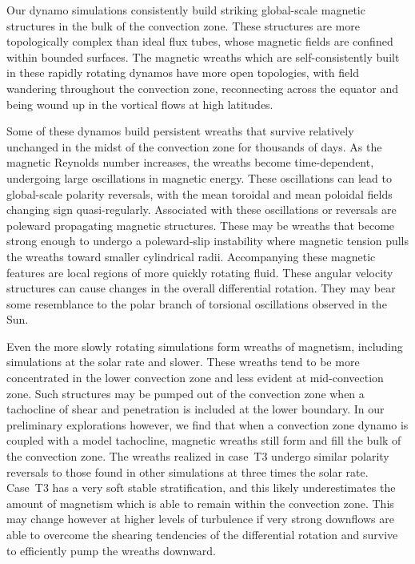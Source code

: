 Our dynamo simulations consistently build striking global-scale
magnetic structures in the bulk of the convection zone.  These
structures are more topologically complex than ideal flux
tubes, whose magnetic fields are confined within bounded surfaces.  The
magnetic wreaths which are self-consistently built in these
rapidly rotating dynamos have more open topologies, with field
wandering throughout the convection zone, reconnecting across the
equator and being wound up in the vortical flows at high latitudes.

Some of these dynamos build persistent wreaths that survive relatively
unchanged in the midst of the convection zone for thousands of days.
As the magnetic Reynolds number increases, the wreaths become
time-dependent, undergoing large oscillations in magnetic energy.
These oscillations can lead to global-scale polarity reversals, with
the mean toroidal and mean poloidal fields changing sign
quasi-regularly.  Associated with these oscillations or reversals are
poleward propagating magnetic structures.  These may be wreaths that
become strong enough to undergo a poleward-slip instability where
magnetic tension pulls the wreaths toward smaller cylindrical radii.
Accompanying these magnetic features are local regions of more quickly
rotating fluid.  These angular velocity structures can cause changes
in the overall differential rotation.  They may bear some resemblance
to the polar branch of torsional oscillations observed in the Sun.   

Even the more slowly rotating simulations form wreaths of
magnetism, including simulations at the solar rate and slower. 
These wreaths tend to be more concentrated in the lower
convection zone and less evident at mid-convection zone.  Such
structures may be pumped out of the convection zone when a tachocline
of shear and penetration is included at the lower boundary.  In our
preliminary explorations however, we find that when a convection zone
dynamo is coupled with a model tachocline, magnetic wreaths still form
and fill the bulk of the convection zone.  The wreaths realized in
case~T3 undergo similar polarity reversals to those found in other
simulations at three times the solar rate.  Case~T3 has a very soft
stable stratification, and this likely underestimates the amount of
magnetism which is able to remain within the convection zone.
This may change however at higher levels of turbulence if very strong
downflows are able to overcome the shearing tendencies of the
differential rotation and survive to efficiently pump the wreaths
downward.

